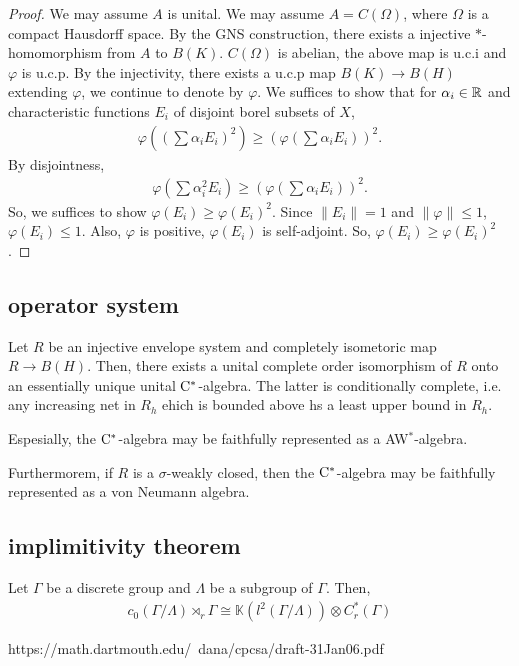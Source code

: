 \begin{proof}
  We may assume $A$ is unital.
  We may assume $A = C(\Omega)$, where $\Omega$ is a compact Hausdorff space.
  By the GNS construction,
  there exists a injective $*$-homomorphism from $A$ to $B(K)$.
  $C(\Omega)$ is abelian, the above map is u.c.i and $\varphi$ is u.c.p.
  By the injectivity, there exists a u.c.p map $B(K) \rightarrow B(H)$ extending $\varphi$, we continue to denote by $\varphi$.
  We suffices to show that for $\alpha_i \in \mathbb{R}$ and characteristic functions $E_i$ of disjoint borel subsets of $X$,
  \begin{align*}
    \varphi((\sum \alpha_i E_i)^2) \geq (\varphi(\sum \alpha_i E_i))^2.
  \end{align*}
  By disjointness,
  \begin{align*}
    \varphi(\sum \alpha_i^2 E_i) \geq (\varphi(\sum \alpha_i E_i))^2.
  \end{align*}
  So, we suffices to show $\varphi(E_i) \geq \varphi(E_i)^2$.
  Since $\|E_i\| = 1$ and $\|\varphi\| \leq 1$,
  $\varphi(E_i) \leq 1$.
  Also, $\varphi$ is positive, $\varphi(E_i)$ is self-adjoint.
  So, $\varphi(E_i) \geq \varphi(E_i)^2$.
\end{proof}

\subsection{operator system}

\begin{theorem}
  Let $R$ be an injective envelope system and completely isometoric map $R \rightarrow B(H)$.
  Then, there exists a unital complete order isomorphism of $R$ onto an essentially unique unital $\rm{C}^*$-algebra.
  The latter is conditionally complete, 
  i.e. any increasing net in $R_h$ ehich is bounded above hs a least upper bound in $R_h$.
  
  Espesially, the $\rm{C}^*$-algebra may be faithfully represented as a AW$^{*}$-algebra.
  
  Furthermorem, if $R$ is a $\sigma$-weakly closed, then the $\rm{C}^*$-algebra may be faithfully represented as a von Neumann algebra.
\end{theorem}

\subsection{implimitivity theorem}
\begin{theorem}
  Let $\Gamma$ be a discrete group and $\Lambda$ be a subgroup of $\Gamma$.
  Then,
  \begin{align*}
    c_0(\Gamma/\Lambda)\rtimes_r\Gamma \cong \mathbb{K}(l^2(\Gamma/\Lambda))\otimes C_r^*(\Gamma)
  \end{align*}
\end{theorem}
https://math.dartmouth.edu/~dana/cpcsa/draft-31Jan06.pdf

